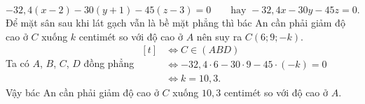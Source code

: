 \begin{bt}
{		$$-32{,}4 (x-2)-30(y+1)-45(z-3)=0 \qquad \text{hay } -32{,}4 x -30y -45z=0.$$
		Để mặt sân sau khi lát gạch vẫn là bề mặt phẳng thì bác An cần phải giảm độ cao ở $C$ xuống $k$ centimét so với độ cao ở $A$ nên suy ra $C(6; 9; -k)$.\\
		Ta có $A$, $B$, $C$, $D$ đồng phẳng	$\begin{aligned}[t]
			&\Leftrightarrow C \in (ABD)\\
			&\Leftrightarrow -32{,}4\cdot 6 -30 \cdot 9 -45\cdot (-k)=0\\
			&\Leftrightarrow k=10{,}3.
		\end{aligned}$\\
		Vậy bác An cần phải giảm độ cao ở $C$ xuống $10{,}3$ centimét so với độ cao ở $A$.
	}
\end{bt}

